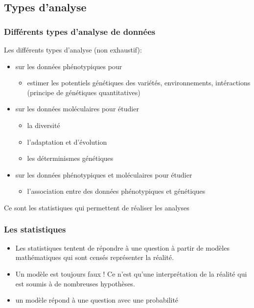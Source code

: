 \subsection{Types d'analyse} 

\begin{frame}
\frametitle{Différents types d'analyse de données}

Les différents types d'analyse (non exhaustif):

\begin{itemize}
\item sur les données phénotypiques pour
	\begin{itemize}
	\item estimer les potentiels génétiques des variétés, environnements, intéractions (principe de génétiques quantitatives)
	\end{itemize}
	
\item sur les données moléculaires pour étudier
	\begin{itemize}
	\item la diversité
	\item l'adaptation et d'évolution
	\item les déterminismes génétiques
	\end{itemize}

\item sur les données phénotypiques et moléculaires pour étudier
	\begin{itemize}
	\item l'association entre des données phénotypiques et génétiques
	\end{itemize}

\end{itemize}

\begin{block}{}
\centering
Ce sont les statistiques qui permettent de réaliser les analyses
\end{block}

\end{frame}


\begin{frame}
\frametitle{Les statistiques}

\begin{itemize}
\item Les statistiques tentent de répondre à une question à partir de modèles mathématiques qui sont censés représenter la réalité. 

\item Un modèle est toujours faux ! Ce n'est qu'une interprétation de la réalité qui est soumis à de nombreuses hypothèses.

\item un modèle répond à une question avec une probabilité
\end{itemize}

\end{frame}




